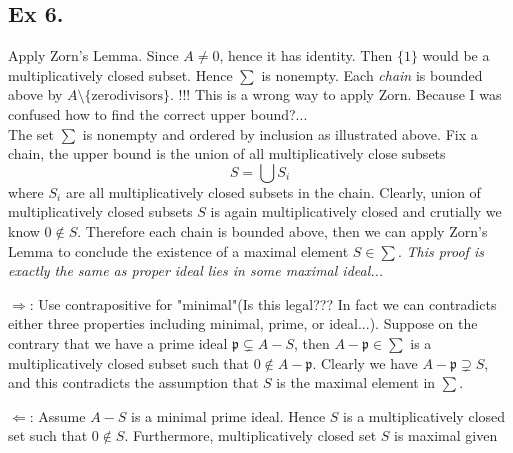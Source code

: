 \subsection{Ex 6.}

Apply Zorn's Lemma. Since $A\neq 0$, hence it has identity. Then $\{1\}$ would be a multiplicatively closed subset. Hence $\sum$ is nonempty. Each \textit{chain} is bounded above by $A\setminus\{\text{zerodivisors}\}$. !!!
This is a wrong way to apply Zorn. Because I was confused how to find the correct upper bound?...\\

The set $\sum$ is nonempty and ordered by inclusion as illustrated above. Fix a chain, the upper bound is the union of all multiplicatively close subsets \[S=\bigcup S_i\] where $S_i$ are all multiplicatively closed subsets in the chain. Clearly, union of multiplicatively closed subsets $S$ is again multiplicatively closed and crutially we know $0\notin S$. Therefore each chain is bounded above, then we can apply Zorn's Lemma to conclude the existence of a maximal element $S\in \sum$. \textit{This proof is exactly the same as proper ideal lies in some maximal ideal...}

$\Rightarrow$: Use contrapositive for "minimal"(Is this legal??? In fact we can contradicts either three properties including minimal, prime, or ideal...). Suppose on the contrary that we have a prime ideal $\mathfrak p\subsetneq A-S$, then $A-\mathfrak p\in \sum$ is a multiplicatively closed subset such that $0\notin A-\mathfrak p$. Clearly we have $A-\mathfrak p\supsetneq S$, and this contradicts the assumption that $S$ is the maximal element in $\sum$.

$\Leftarrow$: Assume $A-S$ is a minimal prime ideal. Hence $S$ is a multiplicatively closed set such that $0\notin S$. Furthermore, multiplicatively closed set $S$ is maximal given